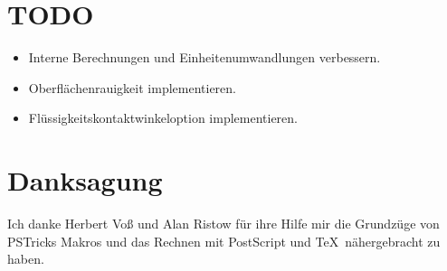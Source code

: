 \documentclass{scrartcl}
\begin{document}
\section{TODO}
\label{sec:todo}

\begin{itemize}
\item Interne Berechnungen und Einheitenumwandlungen verbessern.
\item Oberflächenrauigkeit implementieren.
\item Flüssigkeitskontaktwinkeloption implementieren.
\end{itemize}


\section{Danksagung}
\label{sec:acknowledgements}

Ich danke Herbert Voß und Alan Ristow für ihre Hilfe mir die Grundzüge von
PSTricks Makros und das Rechnen mit PostScript und \TeX\ nähergebracht zu
haben.
\end{document}
